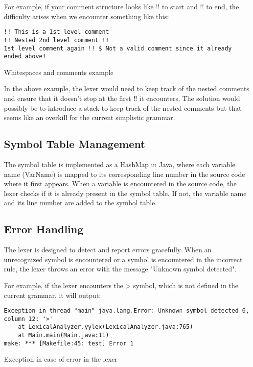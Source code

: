 	For example, if your comment structure looks like !! to start and !! to end, the difficulty arises when we encounter something like this:

\begin{verbatim}
!! This is a 1st level comment
!! Nested 2nd level comment !!
1st level comment again !! $ Not a valid comment since it already ended above!
\end{verbatim}

\begin{table}[h]
    \centering
    \caption{Whitespaces and comments example}
\end{table}

	In the above example, the lexer would need to keep track of the nested comments and ensure that it doesn't stop at the first !! it encounters. The solution would possibly be to
	introduce a stack to keep track of the nested comments but that seems like an overkill for the current simplistic grammar.\\

	\subsection{Symbol Table Management}

	The symbol table is implemented as a HashMap in Java, where each variable name (VarName) is mapped to its corresponding line number in the source code where it first appears.
	When a variable is encountered in the source code, the lexer checks if it is already present in the symbol table. If not, the variable name and its line number are added to the symbol table.

	\subsection{Error Handling}

	The lexer is designed to detect and report errors gracefully. When an unrecognized symbol is encountered or a symbol is encountered in the incorrect rule, the lexer throws an error with the message "Unknown symbol detected".

	For example, if the lexer encounters the > symbol, which is not defined in the current grammar, it will output:

	\begin{verbatim}
Exception in thread "main" java.lang.Error: Unknown symbol detected 6, column 12: '>'
    at LexicalAnalyzer.yylex(LexicalAnalyzer.java:765)
    at Main.main(Main.java:11)
make: *** [Makefile:45: test] Error 1
	\end{verbatim}

    \begin{table}[h]
		\centering
		\caption{Exception in case of error in the lexer}
	\end{table}
 
